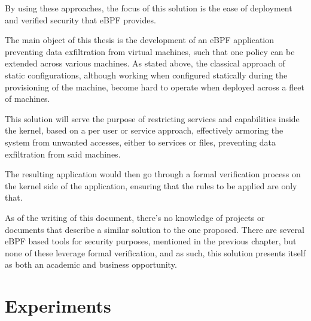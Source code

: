 By using these approaches, the focus of this solution is the ease of deployment and verified security that eBPF provides. 

The main object of this thesis is the development of an eBPF application preventing data exfiltration from virtual machines, such that one policy can be extended across various machines. As stated above, the classical approach of static configurations, although working when configured statically during the provisioning of the machine, become hard to operate when deployed across a fleet of machines. 

This solution will serve the purpose of restricting services and capabilities inside the kernel, based on a per user or service approach, effectively armoring the system from unwanted accesses, either to services or files, preventing data exfiltration from said machines.

The resulting application would then go through a formal verification process on the kernel side of the application, ensuring that the rules to be applied are only that. 

As of the writing of this document, there's no knowledge of projects or documents that describe a similar solution to the one proposed. There are several eBPF based tools for security purposes, mentioned in the previous chapter, but none of these leverage formal verification, and as such, this solution presents itself as both an academic and business opportunity.


\section{Experiments}

